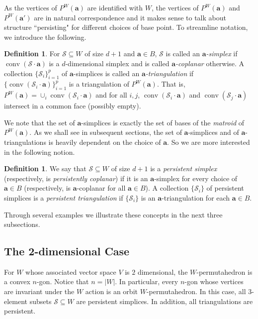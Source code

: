 \documentclass{amsart}
\theoremstyle{definition}
\newtheorem{defn}[thm]{Definition}
\def\ba{\mathbf{a}}
\def\wperm_#1{P^W(#1)}
\def\cS{\mathcal{S}}
\DeclareMathOperator{\conv}{conv}
\begin{document}
 
As the vertices of $\wperm_\ba$ are identified with $W$, the vertices of $\wperm_\ba$ and $\wperm_{\ba'}$ are in natural correspondence and it makes sense to talk about structure ``persisting" for different choices of base point. To streamline notation, we introduce the following.

\begin{defn}
For $\cS \subseteq W$ of size $d+1$ and $\ba \in B$, $\cS$ is called an \emph{$\ba$-simplex} if $\conv(\cS \cdot \ba)$ is a $d$-dimensional simplex and is called \emph{$\ba$-coplanar} otherwise. A collection $\{\cS_i\}_{i=1}^p$ of $\ba$-simplices is called an \emph{$\ba$-triangulation} if $\{\conv(\cS_i \cdot \ba )\}_{i=1}^p$ is a triangulation of $\wperm_\ba$. That is, $\wperm_\ba = \cup_{i} \conv(\cS_i \cdot \ba)$ and for all $i,j$,  $\conv(\cS_i \cdot \ba)$ and $\conv(\cS_j \cdot \ba)$ intersect in a common face (possibly empty).   
\end{defn}

We note that the set of $\ba$-simplices is exactly the set of bases of the \emph{matroid} of $\wperm_\ba$. As we shall see in subsequent sections, the set of $\ba$-simplices and of $\ba$-triangulations is heavily dependent on the choice of $\ba$. So we are more interested in the 
following notion.

\begin{defn}
We say that $\cS \subseteq W$ of size $d +1$ is a \emph{persistent simplex} (respectively, is \emph{persistently coplanar}) if it is an $\ba$-simplex for every choice of $\ba \in B$ (respectively, is $\ba$-coplanar for all $\ba \in B$). A collection $\{\cS_i\}$ of persistent simplices is a \emph{persistent triangulation} if $\{\cS_i\}$ is an $\ba$-triangulation for each $\ba \in B$.
\end{defn}

Through several examples we illustrate these concepts in the next three subsections.


\subsection{The 2-dimensional Case}

For $W$ whose associated vector space $V$ is $2$ dimensional, the $W$-permutahedron is a convex $n$-gon. Notice that $n=|W|$. In particular, every $n$-gon whose vertices are invariant under the $W$ action is an orbit $W$-permutahedron. In this case, all 3-element subsets $\cS \subseteq W$ are persistent simplices. In addition, all triangulations are persistent.
\end{document}
